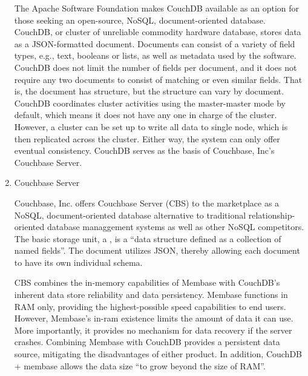 \begin{enumerate}
The Apache Software Foundation makes CouchDB available as an
option for those seeking an open-source, NoSQL, document-oriented
database. CouchDB, or cluster of unreliable commodity hardware
database, \label{\detokenize{i524/technologies:id420}}{\hyperref[\detokenize{i524/technologies:www-exploringcdb-couchdb}]{\sphinxcrossref{{[}359{]}}}} stores data as a
JSON-formatted document.  Documents can consist of a variety of
field types, e.g., text, booleans or lists, as well as metadata
used by the software.  \label{\detokenize{i524/technologies:id421}}{\hyperref[\detokenize{i524/technologies:www-techoverview-couchdb}]{\sphinxcrossref{{[}360{]}}}} CouchDB
does not limit the number of fields per document, and it does not
require any two documents to consist of matching or even similar
fields.  That is, the document has structure, but the structure
can vary by document.  CouchDB coordinates cluster activities
using the master-master mode by default, which means it does not
have any one in charge of the cluster.  However, a cluster can be
set up to write all data to single node, which is then replicated
across the cluster.  Either way, the system can only offer
eventual consistency.  \label{\detokenize{i524/technologies:id422}}{\hyperref[\detokenize{i524/technologies:www-cdb-vs-cbs-couchdb}]{\sphinxcrossref{{[}361{]}}}} CouchDB
serves as the basis of Couchbase, Inc's Couchbase Server.

\item {} 
Couchbase Server

Couchbase, Inc. offers Couchbase Server (CBS) to the marketplace
as a NoSQL, document-oriented database alternative to traditional
relationship- oriented database managgement systems as well as
other NoSQL competitors.  The basic storage unit, a ,
is a ``data structure defined as a collection of named fields''.
The document utilizes JSON, thereby allowing each document to
have its own individual schema. \label{\detokenize{i524/technologies:id423}}{\hyperref[\detokenize{i524/technologies:www-infoworld-cbs}]{\sphinxcrossref{{[}362{]}}}}

CBS combines the in-memory capabilities of Membase with CouchDB's
inherent data store reliability and data persistency.  Membase
functions in RAM only, providing the highest-possible speed
capabilities to end users.  However, Membase's in-ram existence
limits the amount of data it can use.  More importantly, it
provides no mechanism for data recovery if the server crashes.
Combining Membase with CouchDB provides a persistent data source,
mitigating the disadvantages of either product.  In addition,
CouchDB + membase allows the data size ``to grow beyond the size
of RAM''.  \label{\detokenize{i524/technologies:id424}}{\hyperref[\detokenize{i524/technologies:www-safaribooks-cbs}]{\sphinxcrossref{{[}363{]}}}}


\end{enumerate}
